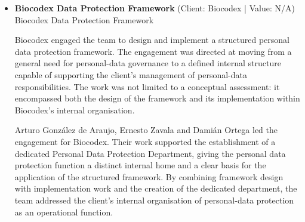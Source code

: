 \documentclass[11pt]{article}
\begin{document}
\begin{itemize}
The team’s role extended beyond general data protection advice. The firm represented MEGA DIRECT, S.A. de C.V. in legal proceedings concerning data acquisition, processing, storage, and protection. This required the team to address each of those distinct stages of the data-handling cycle—acquisition, processing, storage, and protection—in the context of proceedings affecting the client’s business activities.

Arturo González de Araujo, Ernesto Zavala, and Damián Ortega were the lead partners on the engagement. Their work combined the long-term advisory dimension of the 16-year relationship with representation in the relevant legal proceedings. The stated client impact was the preservation of business continuity in a highly regulated environment, where the treatment and protection of data and the management of database-related issues were directly connected to the client’s ongoing operations.

For the submission, the matter provides evidence of sustained data protection and database-related work over 16 years, coupled with proceedings representation concerning data acquisition, processing, storage, and protection. It demonstrates a long-duration institutional engagement in which Arturo González de Araujo, Ernesto Zavala, and Damián Ortega supported MEGA DIRECT, S.A. de C.V. on matters bearing directly on business continuity.
\item \textbf{Biocodex Data Protection Framework} (Client: Biocodex | Value: N/A)\\ Biocodex Data Protection Framework

Biocodex engaged the team to design and implement a structured personal data protection framework. The engagement was directed at moving from a general need for personal-data governance to a defined internal structure capable of supporting the client’s management of personal-data responsibilities. The work was not limited to a conceptual assessment: it encompassed both the design of the framework and its implementation within Biocodex’s internal organisation.

Arturo González de Araujo, Ernesto Zavala and Damián Ortega led the engagement for Biocodex. Their work supported the establishment of a dedicated Personal Data Protection Department, giving the personal data protection function a distinct internal home and a clear basis for the application of the structured framework. By combining framework design with implementation work and the creation of the dedicated department, the team addressed the client’s internal organisation of personal-data protection as an operational function.


\end{itemize}
\end{document}
